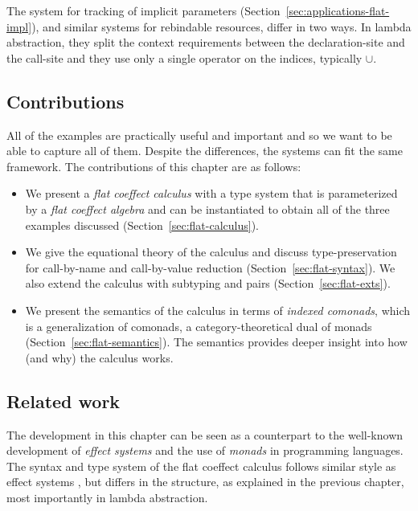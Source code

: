The system for tracking of implicit parameters (Section~\ref{sec:applications-flat-impl}), and
similar systems for rebindable resources, differ in two ways. In lambda abstraction, they split
the context requirements between the declaration-site and the call-site and they use only a single
operator on the indices, typically $\cup$.


\subsection{Contributions}

All of the examples are practically useful and important and so we want to be able to capture all
of them. Despite the differences, the systems can fit the same framework. The contributions of this
chapter are as follows:

\begin{itemize}
\item We present a \emph{flat coeffect calculus} with a type system that is parameterized by a 
  \emph{flat coeffect algebra} and can be instantiated to obtain all of the three examples
  discussed (Section~\ref{sec:flat-calculus}).
  
\item We give the equational theory of the calculus and discuss type-preservation for call-by-name
  and call-by-value reduction (Section~\ref{sec:flat-syntax}). We also extend the calculus
  with subtyping and pairs (Section~\ref{sec:flat-exts}).
  
\item We present the semantics of the calculus in terms of \emph{indexed comonads}, which is a
  generalization of comonads, a category-theoretical dual of monads (Section~\ref{sec:flat-semantics}).
  The semantics provides deeper insight into how (and why) the calculus works.
\end{itemize}


\subsection{Related work}

The development in this chapter can be seen as a counterpart to the well-known development of 
\emph{effect systems} \cite{effects-gifford} and the use of \emph{monads} \cite{monad-notions}
in programming languages. The syntax and type system of the flat coeffect calculus follows 
similar style as effect systems \cite{effects-polymorphic,effects-talpin-et-al}, but differs
in the structure, as explained in the previous chapter, most importantly in lambda abstraction.

